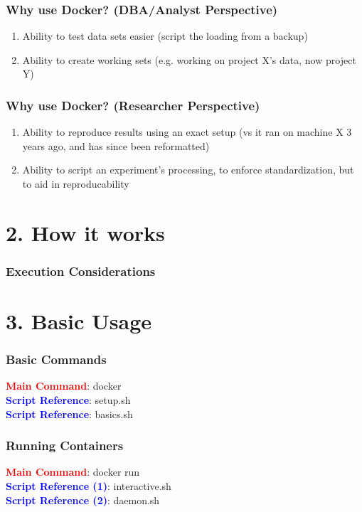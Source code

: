 \documentclass{beamer}
\begin{document}
\begin{frame}
    \frametitle{Why use Docker? (DBA/Analyst Perspective)}
    \begin{enumerate}
        \item Ability to test data sets easier (script the loading from a backup)
        \item Ability to create working sets (e.g. working on project X's data, now project Y)
    \end{enumerate}
\end{frame}

\begin{frame}
    \frametitle{Why use Docker? (Researcher Perspective)}
    \begin{enumerate}
        \item Ability to reproduce results using an exact setup (vs it ran on machine X 3 years ago, and has since been reformatted)
        \item Ability to script an experiment's processing, to enforce standardization, but to aid in reproducability
    \end{enumerate}
\end{frame}

\section{2. How it works}
\begin{frame}
    \frametitle{Execution Considerations}
    
\end{frame}

\section{3. Basic Usage}
\begin{frame}
    \frametitle{Basic Commands}
    \textcolor{red}{\textbf{Main Command}}: docker \\
    \textcolor{blue}{\textbf{Script Reference}}: setup.sh \\
    \textcolor{blue}{\textbf{Script Reference}}: basics.sh
\end{frame}

\begin{frame}
    \frametitle{Running Containers}
    \textcolor{red}{\textbf{Main Command}}: docker run \\
    \textcolor{blue}{\textbf{Script Reference (1)}}: interactive.sh \\
    \textcolor{blue}{\textbf{Script Reference (2)}}: daemon.sh
\end{frame}
\end{document}
